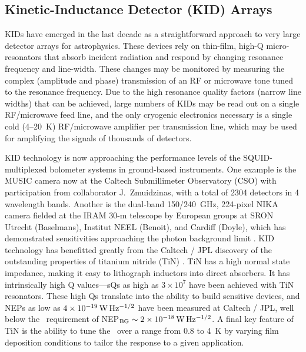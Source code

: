 \subsection{Kinetic-Inductance Detector (KID) Arrays}  
\label{sec: Detectors} 

KIDs have emerged in the last decade as a straightforward approach to very large detector arrays for astrophysics.  These devices rely on thin-film, high-Q micro-resonators that absorb incident radiation and respond by changing resonance frequency and line-width.  These changes may be monitored by measuring the complex (amplitude and phase) transmission of an RF or microwave tone tuned to the resonance frequency.  %
Due to the high resonance quality factors (narrow line widths) that can be achieved, large numbers of KIDs may be read out on a single RF/microwave feed line, and the only cryogenic electronics necessary is a single cold (4--20~K) RF/microwave amplifier per transmission line, which may be used for amplifying the signals of thousands of detectors.

KID technology is now approaching the performance levels of the SQUID-multiplexed bolometer systems in ground-based instruments.  One example is the MUSIC camera now at the Caltech Submillimeter Observatory (CSO) \cite{Schlaerth_10} with participation from collaborator J.\ Zmuidzinas, with a total of 2304 detectors in 4 wavelength bands.  Another is the dual-band 150/240~GHz, 224-pixel NIKA camera fielded at the IRAM 30-m telescope by European groups at SRON Utrecht (Baselmans), Institut NEEL (Benoit), and Cardiff (Doyle), which has demonstrated sensitivities approaching the photon background limit  \citep{Monfardini_11, Yates_11,Calvo_13}. 
KID technology has benefitted greatly from the Caltech / JPL discovery of the outstanding properties of titanium nitride (TiN) \cite{LeDuc_10}.   TiN has a high normal state impedance, making it easy to lithograph inductors into direct absorbers.  It has intrinsically high Q values---sQs as high as $3\times10^{7}$ have been achieved with TiN resonators.  These high Qs translate into the ability to build sensitive devices, and NEPs as low as $4\times10^{-19}\,\rm W\,Hz^{-1/2}$ have been measured at Caltech / JPL,  well below the \name\ requirement of NEP$_{\rm BG}\sim2\times10^{-18}\,\rm W\,Hz^{-1/2}$.   A final key feature of TiN is the ability to tune the \Tc\ over a range from 0.8 to 4~K by varying film deposition conditions to tailor the response to a given application.  


